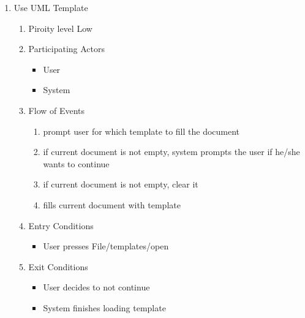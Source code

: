 \documentclass[a4paper, 12pt]{article}
\begin{document}
\begin{enumerate}
\item Use UML Template
  \begin {enumerate}
  \item Piroity level Low
  \item Participating Actors
    \begin {itemize}
    \item User
    \item System
    \end {itemize}
  \item Flow of Events
    \begin {enumerate}
    \item prompt user for which template to fill the document
    \item if current document is not empty, system prompts the user if he/she wants to continue
    \item if current document is not empty, clear it
    \item fills current document with template
    \end {enumerate}
  \item Entry Conditions
    \begin{itemize}
    \item User presses File/templates/open
    \end {itemize}
  \item Exit Conditions
    \begin {itemize}
    \item User decides to not continue
    \item System finishes loading template
    \end {itemize}
  \end {enumerate}
\end {enumerate}
\end{document}
